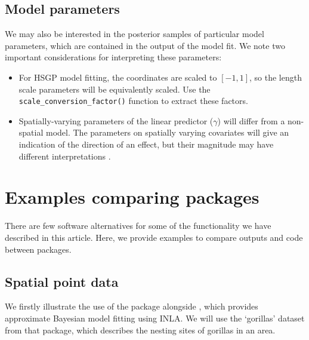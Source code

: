 \subsection{Model parameters}
We may also be interested in the posterior samples of particular model parameters, which are contained in the output of the model fit. We note two important considerations for interpreting these parameters: 
\begin{itemize}
    \item For HSGP model fitting, the coordinates are scaled to $[-1,1]$, so the length scale parameters will be equivalently scaled. Use the \texttt{scale\_conversion\_factor()} function to extract these factors.
    \item Spatially-varying parameters of the linear predictor ($\gamma$) will differ from a non-spatial model. The parameters on spatially varying covariates will give an indication of the direction of an effect, but their magnitude may have different interpretations \citep{Hodges2010,Reich2006}.
\end{itemize}

\section{Examples comparing packages}
There are few software alternatives for some of the functionality we have described in this article. Here, we provide examples to compare outputs and code between packages.

\subsection{Spatial point data}
We firstly illustrate the use of the package alongside  \citep{Bachl2019}, which provides approximate Bayesian model fitting using INLA. We will use the `gorillas' dataset from that package, which describes the nesting sites of gorillas in an area. 

